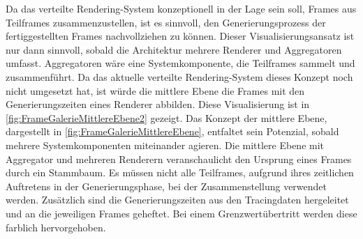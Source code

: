 Da das verteilte Rendering-System konzeptionell in der Lage sein soll, Frames aus Teilframes zusammenzustellen, ist es sinnvoll, den Generierungsprozess der fertiggestellten Frames nachvollziehen zu können. Dieser Visualisierungsansatz ist nur dann sinnvoll, sobald die Architektur mehrere Renderer und Aggregatoren umfasst. Aggregatoren wäre eine Systemkomponente, die Teilframes sammelt und zusammenführt. Da das aktuelle verteilte Rendering-System dieses Konzept noch nicht umgesetzt hat, ist würde die mittlere Ebene die Frames mit den Generierungszeiten eines Renderer abbilden. Diese Visualisierung ist in \cref{fig:FrameGalerieMittlereEbene2} gezeigt. Das Konzept der mittlere Ebene, dargestellt in \cref{fig:FrameGalerieMittlereEbene}, entfaltet sein Potenzial, sobald mehrere Systemkomponenten miteinander agieren. Die mittlere Ebene mit Aggregator und mehreren Renderern veranschaulicht den Ursprung eines Frames durch ein Stammbaum. Es müssen nicht alle Teilframes, aufgrund ihres zeitlichen Auftretens in der Generierungsphase, bei der Zusammenstellung verwendet werden. Zusätzlich sind die Generierungszeiten aus den Tracingdaten hergeleitet und an die jeweiligen Frames geheftet. Bei einem Grenzwertübertritt werden diese farblich hervorgehoben.

